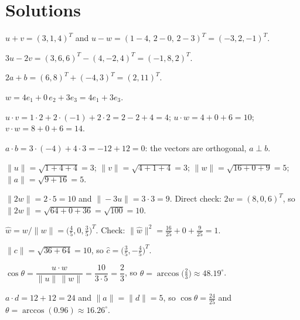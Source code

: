 \section{Solutions}

\begin{solutions}
  \item $u + v = (3, 1, 4)^{T}$ and $u - w = (1 - 4,\, 2 - 0,\, 2 - 3)^{T} = (-3, 2, -1)^{T}$.

  \item $3 u - 2 v = (3, 6, 6)^{T} - (4, -2, 4)^{T} = (-1, 8, 2)^{T}$.

  \item $2 a + b = (6, 8)^{T} + (-4, 3)^{T} = (2, 11)^{T}$.

  \item $w = 4 e_{1} + 0 \, e_{2} + 3 e_{3} = 4 e_{1} + 3 e_{3}$.

  \item $u \cdot v = 1 \cdot 2 + 2 \cdot (-1) + 2 \cdot 2 = 2 - 2 + 4 = 4$;
        $u \cdot w = 4 + 0 + 6 = 10$;
        $v \cdot w = 8 + 0 + 6 = 14$.

  \item $a \cdot b = 3 \cdot (-4) + 4 \cdot 3 = -12 + 12 = 0$: the vectors
        are orthogonal, $a \perp b$.

  \item $\|u\| = \sqrt{1 + 4 + 4} = 3$;\;
        $\|v\| = \sqrt{4 + 1 + 4} = 3$;\;
        $\|w\| = \sqrt{16 + 0 + 9} = 5$;\;
        $\|a\| = \sqrt{9 + 16} = 5$.

  \item $\|2 w\| = 2 \cdot 5 = 10$ and $\|-3 u\| = 3 \cdot 3 = 9$. Direct
        check: $2 w = (8, 0, 6)^{T}$, so
        $\|2 w\| = \sqrt{64 + 0 + 36} = \sqrt{100} = 10$.

  \item $\hat{w} = w / \|w\| = \bigl(\tfrac{4}{5}, 0, \tfrac{3}{5}\bigr)^{T}$.
        Check: $\|\hat{w}\|^{2} = \tfrac{16}{25} + 0 + \tfrac{9}{25} = 1$.

  \item $\|c\| = \sqrt{36 + 64} = 10$, so
        $\hat{c} = \bigl(\tfrac{3}{5}, -\tfrac{4}{5}\bigr)^{T}$.

  \item $\cos \theta = \dfrac{u \cdot w}{\|u\| \, \|w\|}
        = \dfrac{10}{3 \cdot 5} = \dfrac{2}{3}$, so
        $\theta = \arccos\bigl(\tfrac{2}{3}\bigr) \approx 48.19^{\circ}$.

  \item $a \cdot d = 12 + 12 = 24$ and $\|a\| = \|d\| = 5$, so
        $\cos \theta = \tfrac{24}{25}$ and
        $\theta = \arccos(0.96) \approx 16.26^{\circ}$.


\end{solutions}
